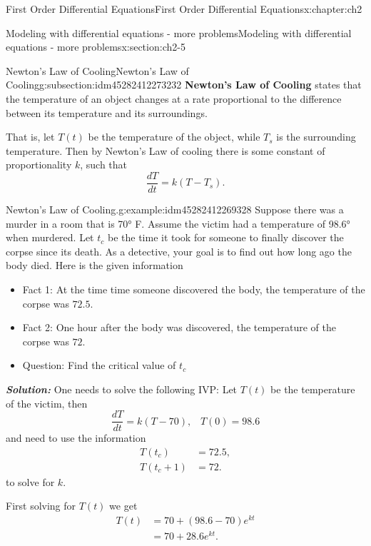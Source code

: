 \documentclass[oneside,10pt,]{book}
\newcommand{\alert}[1]{\textbf{\textit{#1}}}
\newcommand{\terminology}[1]{\textbf{#1}}
\numberwithin{equation}{section}
\numberwithin{equation}{section}
\newcommand{\amp}{&}
\begin{document}
\begin{chapterptx}{First Order Differential Equations}{}{First Order Differential Equations}{}{}{x:chapter:ch2}
\begin{sectionptx}{Modeling with differential equations - more problems}{}{Modeling with differential equations - more problems}{}{}{x:section:ch2-5}
%
%
\typeout{************************************************}
\typeout{************************************************}
%
\begin{subsectionptx}{Newton's Law of Cooling}{}{Newton's Law of Cooling}{}{}{g:subsection:idm45282412273232}
\terminology{Newton's Law of Cooling} states that the temperature of an object changes at a rate proportional to the difference between its temperature and its surroundings.%
\par
That is, let \(T(t)\) be the temperature of the object, while \(T_{s}\) is the surrounding temperature. Then by Newton's Law of cooling there is some constant of proportionality \(k\), such that%
\begin{equation*}
\frac{dT}{dt}=k\left(T-T_{s}\right).
\end{equation*}
%
\begin{example}{Newton's Law of Cooling.}{g:example:idm45282412269328}%
Suppose there was a murder in a room that is 70° F. Assume the victim had a temperature of 98.6° when murdered. Let \(t_{c}\) be the time it took for someone to finally discover the corpse since its death. As a detective, your goal is to find out how long ago the body died. Here is the given information %
\begin{itemize}[label=\textbullet]
\item{}Fact 1: At the time time someone discovered the body, the temperature of the corpse was \(72.5\).%
\item{}Fact 2: One hour after the body was discovered, the temperature of the corpse was \(72\).%
\item{}Question: Find the critical value of \(t_{c}\)%
\end{itemize}
\alert{Solution:} One needs to solve the following IVP: Let \(T(t)\) be the temperature of the victim, then%
\begin{equation*}
\frac{dT}{dt}=k\left(T-70\right),\,\,\,\,\,T\left(0\right)=98.6
\end{equation*}
and need to use the information%
\begin{align*}
T(t_{c}) \amp =72.5,\\
T(t_{c}+1) \amp =72.
\end{align*}
to solve for \(k\).%
\par
First solving for \(T(t)\) we get%
\begin{align*}
T(t) \amp =70+\left(98.6-70\right)e^{kt}\\
\amp =70+28.6e^{kt}.
\end{align*}

\end{example}
\end{subsectionptx}
\end{sectionptx}
\end{chapterptx}
\end{document}
